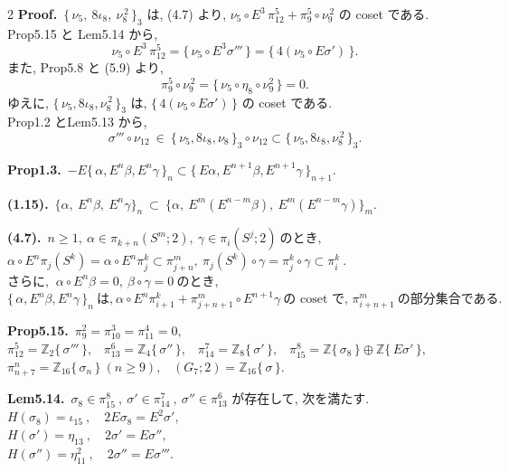 \documentclass[10pt, leqno]{ltjsarticle}
\newcommand{\Ex}{E}        %
\newcommand{\todai}[2][]{\{\,#2\,\}_{#1}}      %
\newcommand{\gen}[1]{\{\,#1\,\}}       %
\newcommand{\pis}[2]{\pi_{#1}(#2)}       %
\newcommand{\pit}[2]{\pi_{#1}^{#2}}
\numberwithin{equation}{section}
\theoremstyle{plain}
\theoremstyle{definition}
\theoremstyle{remark}
\begin{document}
\begin{paracol}{2}
\noindent
\textbf{Proof.}\
\(\todai[3]{\nu_5,\ 8\iota_8,\ \nu_8^{\,2}}\) は, 
(4.7) より,
\(\nu_5\circ E^3\,\pi^{5}_{12}+\pi^{5}_{9}\circ \nu_9^{\,2}\) の coset である. \\
Prop5.15 と Lem5.14 から,
\[
\nu_5\circ E^3\,\pi^{5}_{12}
=\gen{\nu_5\circ E^{3}\sigma'''}
=\gen{4(\nu_5\circ E\sigma')} .
\]
また, Prop5.8 と (5.9) より, 
\[
\pi^{5}_{9}\circ \nu_9^{\,2} = \gen{\nu_5\circ\eta_8\circ\nu_9^2} = 0 .
\]
ゆえに, \(\todai[3]{\nu_5,8\iota_8,\nu_8^{\,2}}\) は,
\(\gen{4(\nu_5\circ E\sigma')}\) の coset である. \\
Prop1.2 とLem5.13 から,
\[
\sigma'''\circ \nu_{12}\ \in\
\todai[3]{\nu_5,8\iota_8,\nu_8}\circ \nu_{12}
\subset \todai[3]{\nu_5,8\iota_8,\nu_8^{\,2}}.
\]

\switchcolumn

\noindent
\textbf{Prop1.3.}\
\(-E\todai[n]{\alpha, E^n\beta, E^n\gamma}
\subset \todai[n+1]{E\alpha, E^{n+1}\beta, E^{n+1}\gamma}\).

\noindent
\textbf{(1.15).}\
\(\{\alpha,\ \Ex^n\beta,\ \Ex^n\gamma\}_n
\ \subset\
\bigl\{\alpha,\ \Ex^{m}(E^{n-m}\beta),\ E^{m}(E^{n-m}\gamma)\bigr\}_m .\)

\noindent
\textbf{(4.7).}\
\(n\ge1, \ \alpha\in\pis{k+n}{S^m; 2},\ \gamma\in\pis{i}{S^j; 2}
    \ \text{のとき, }\)\\
\(\alpha\circ E^n\pis{j}{S^k} = \alpha\circ E^n \pit{j}{k}
  \subset \pit{j+n}{m},
  \ \pis{j}{S^k}\circ\gamma = \pit{j}{k}\circ\gamma \subset\pit{i}{k}\ . \)\\
\(\text{さらに, }\ \alpha\circ E^n\beta=0,\ \beta\circ\gamma = 0 \ \text{のとき, }\)\\
\(\todai[n]{\alpha, E^n\beta, E^n\gamma}\ \text{は,}\
  \alpha\circ E^n\pit{i+1}{k} + \pit{j+n+1}{m}\circ E^{n+1}\gamma\
  \text{の coset で, }\pit{i+n+1}{m} \ \text{の部分集合である. }\)

\noindent
\textbf{Prop5.15.}\
\(\pi_9^2=\pi_{10}^3=\pi_{11}^4=0,\) \\
\(\pi^{5}_{12}=\mathbb Z_2\gen{\sigma'''},\) \
\(\pi^{6}_{13}=\mathbb Z_4\gen{\sigma''},\) \
\(\pi^{7}_{14}=\mathbb Z_8\gen{\sigma'},\) \
\(\pi^{8}_{15}=\mathbb Z\gen{\sigma_8}\oplus\mathbb Z\gen{E\sigma'},\) \\
\(\pi^{n}_{n+7}=\mathbb Z_{16}\gen{\sigma_n}\ (n\ge9),\) \
\((G_{7};2)=\mathbb Z_{16}\gen{\sigma}.\)

\noindent
\textbf{Lem5.14.}\
\(\sigma_{8}\in\pi^{8}_{15}\ , \ \sigma'\in\pi^{7}_{14}\ , \ \sigma''\in\pi^{6}_{13}\) 
が存在して, 次を満たす. \\
\(H(\sigma_{8})=\iota_{15} \ ,\quad 2E\sigma_{8}=E^{2}\sigma',\)\\
\(H(\sigma')=\eta_{13} \ ,\quad 2\sigma'=E\sigma'',\)\\
\(H(\sigma'')=\eta_{11}^2 \ ,\quad 2\sigma''=E\sigma''' .\)


\end{paracol}
\end{document}
